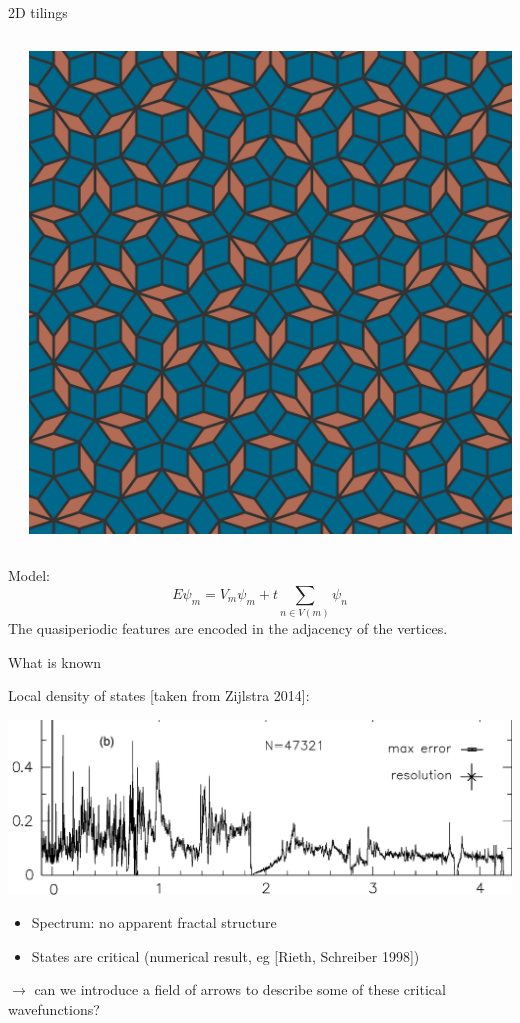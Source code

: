 \documentclass[xcolor=x11names,compress,professionalfonts, aspectratio=169]{beamer}
\renewcommand{\(}{\begin{columns}}
\renewcommand{\)}{\end{columns}}
\newcommand{\<}[1]{\begin{column}{#1}}
\renewcommand{\>}{\end{column}}
\begin{document}
\begin{frame}{2D tilings}
\begin{columns}
\begin{column}{5cm}
{}
\end{column}
\begin{column}{5cm}
{\centering
\includegraphics[scale=.08]{img/penrose.png}

}
\end{column}
\end{columns}
Model:
\[
	E \psi_m = V_m \psi_m + t\sum_{n \in V(m)} \psi_n
\]
The quasiperiodic features are encoded in the adjacency of the vertices.
\end{frame}

\begin{frame}{What is known}

Local density of states [taken from Zijlstra 2014]:

{\centering
\includegraphics[scale=.1]{img/idos_AB_small.png}

}
\begin{itemize}
	\item Spectrum: no apparent fractal structure
	\item States are critical (numerical result, eg [Rieth, Schreiber 1998])
\end{itemize}
$\rightarrow$ can we introduce a field of arrows to describe some of these critical wavefunctions?
\end{frame}
\end{document}
